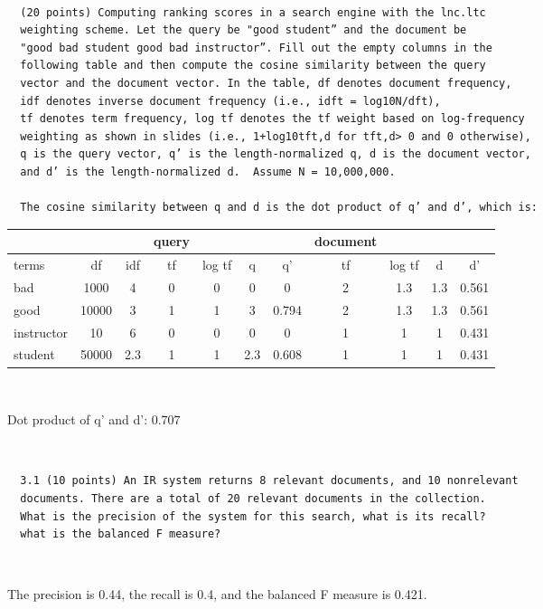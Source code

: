 \documentclass[12pt]{article}
\begin{document}
\

\begin{verbatim}
  (20 points) Computing ranking scores in a search engine with the lnc.ltc 
  weighting scheme. Let the query be "good student” and the document be
  "good bad student good bad instructor”. Fill out the empty columns in the
  following table and then compute the cosine similarity between the query 
  vector and the document vector. In the table, df denotes document frequency,
  idf denotes inverse document frequency (i.e., idft = log10N/dft),
  tf denotes term frequency, log tf denotes the tf weight based on log-frequency 
  weighting as shown in slides (i.e., 1+log10tft,d for tft,d> 0 and 0 otherwise), 
  q is the query vector, q’ is the length-normalized q, d is the document vector, 
  and d’ is the length-normalized d.  Assume N = 10,000,000.
  
  The cosine similarity between q and d is the dot product of q’ and d’, which is:                             
\end{verbatim}

\begin{tabular}{lcc|cccc|cccc}
  & & & query & & & & document & & & \\
  \hline
  terms & df & idf & tf & log tf & q & q' & tf & log tf & d & d' \\
  \hline
  bad & 1000 & 4 & 0 & 0 & 0 & 0 & 2 & 1.3 & 1.3 & 0.561 \\
  good & 10000 & 3 & 1 & 1 & 3 & 0.794 & 2 & 1.3 & 1.3 & 0.561 \\
  instructor & 10 & 6 & 0 & 0 & 0 & 0 & 1 & 1 & 1 & 0.431 \\
  student & 50000 & 2.3 & 1 & 1 & 2.3 & 0.608 & 1 & 1 & 1 & 0.431 \\
   
\end{tabular}

\

Dot product of q' and d': 0.707

\

\begin{verbatim}
  3.1 (10 points) An IR system returns 8 relevant documents, and 10 nonrelevant
  documents. There are a total of 20 relevant documents in the collection.
  What is the precision of the system for this search, what is its recall?
  what is the balanced F measure?
\end{verbatim}

\

The precision is 0.44, the recall is 0.4, and the balanced F measure is 0.421.
\end{document}
